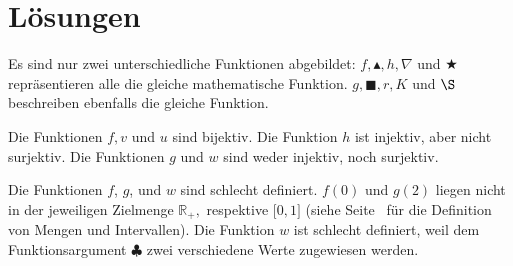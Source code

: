 \documentclass[12pt]{article}
\begin{document}
\section{Lösungen}

\begin{solution}%
Es sind nur zwei unterschiedliche Funktionen abgebildet: $f, \blacktriangle, h, \nabla$ und $\bigstar$ repräsentieren alle die gleiche mathematische Funktion.
$g, \blacksquare, r, K$ und $\S$ beschreiben ebenfalls die gleiche Funktion.
\end{solution}

\begin{solution}
Die Funktionen $f, v$ und $u$ sind bijektiv. Die Funktion $h$ ist injektiv, aber nicht surjektiv. Die Funktionen $g$ und $w$ sind weder injektiv, noch surjektiv.
\end{solution}

\begin{solution}
Die Funktionen $f$, $g$, und $w$ sind schlecht definiert. $f(0)$ und $g(2)$ liegen nicht in der jeweiligen Zielmenge $\mathbb{R}_{+},$ respektive $\lbrack 0, 1 \rbrack$ (siehe Seite~\pageref{terminologie} für die Definition von Mengen und Intervallen). Die Funktion $w$ ist schlecht definiert, weil dem Funktionsargument $\clubsuit$ zwei verschiedene Werte zugewiesen werden.
\end{solution}
\end{document}

